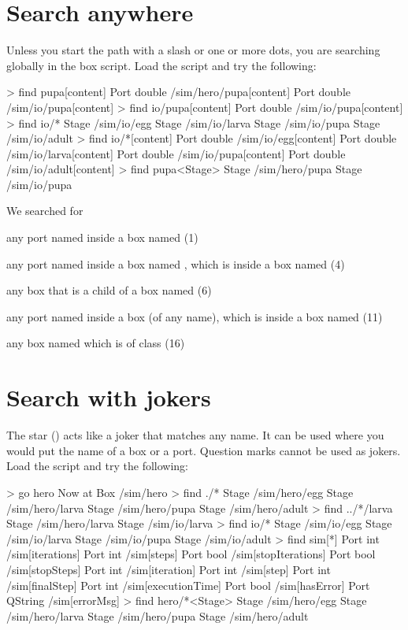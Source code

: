 \section{Search anywhere}
Unless you start the path with a slash or one or more dots, you are searching globally in the box script. Load the  script and try the following:

\lstset{numbers=left}
\begin{usdialog}
> find pupa[content]
Port double /sim/hero/pupa[content]
Port double /sim/io/pupa[content]
> find io/pupa[content]
Port double /sim/io/pupa[content]
> find io/*
Stage /sim/io/egg
Stage /sim/io/larva
Stage /sim/io/pupa
Stage /sim/io/adult
> find io/*[content]
Port double /sim/io/egg[content]
Port double /sim/io/larva[content]
Port double /sim/io/pupa[content]
Port double /sim/io/adult[content]
> find pupa<Stage>
Stage /sim/hero/pupa
Stage /sim/io/pupa
\end{usdialog}
\lstset{numbers=none}

\noindent
We searched for 
\begin{compactitem}
\item any port named  inside a box named  (1)
\item any port named  inside a box named , which is inside a box named  (4)
\item any box that is a child of a box named  (6)
\item any port named  inside a box (of any name), which is inside a box named  (11)
\item any box named  which is of class  (16)
\end{compactitem}

\section{Search with jokers}
\label{ch:path-expressions-jokers}
The star (\code{*}) acts like a joker that matches any name. It can be used where you would put the name of a box or a port. Question marks cannot be used as jokers.   Load the  script and try the following:

\lstset{numbers=left}
\begin{usdialog}
> go hero
Now at Box /sim/hero
> find ./*
Stage /sim/hero/egg
Stage /sim/hero/larva
Stage /sim/hero/pupa
Stage /sim/hero/adult
> find ../*/larva
Stage /sim/hero/larva
Stage /sim/io/larva
> find io/*
Stage /sim/io/egg
Stage /sim/io/larva
Stage /sim/io/pupa
Stage /sim/io/adult
> find sim[*]
Port int     /sim[iterations]
Port int     /sim[steps]
Port bool    /sim[stopIterations]
Port bool    /sim[stopSteps]
Port int     /sim[iteration]
Port int     /sim[step]
Port int     /sim[finalStep]
Port int     /sim[executionTime]
Port bool    /sim[hasError]
Port QString /sim[errorMsg]
> find hero/*<Stage>
Stage /sim/hero/egg
Stage /sim/hero/larva
Stage /sim/hero/pupa
Stage /sim/hero/adult
\end{usdialog}
\lstset{numbers=none}

